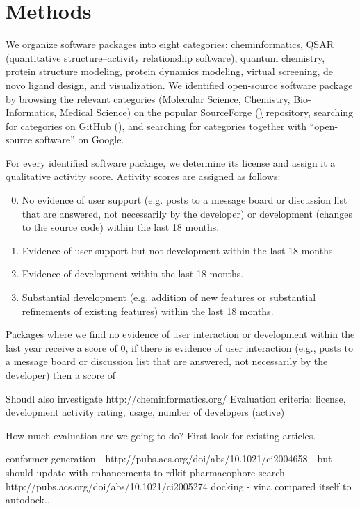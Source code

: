 \section{Methods}

We organize software packages into eight categories: cheminformatics, QSAR (quantitative structure–activity relationship software), quantum chemistry, protein structure modeling, protein dynamics modeling, virtual screening, de novo ligand design, and visualization.
We identified open-source software package by browsing the relevant categories (Molecular Science, Chemistry, Bio-Informatics, Medical Science) on the popular SourceForge (\href{http://sourceforge.net}) repository, searching for categories on GitHub (\href{http://github.com}), and searching for categories together with ``open-source software'' on Google.

For every identified software package, we determine its license and assign it a qualitative activity score. Activity scores are assigned as follows: 
\begin{enumerate}
  \setcounter{enumi}{-1}
  \item No evidence of user support (e.g. posts to a message board or discussion list that are answered, not necessarily by the developer) or development (changes to the source code) within the last 18 months.
  \item Evidence of user support but not development within the last 18 months.
  \item Evidence of development within the last 18 months.
  \item Substantial development (e.g. addition of new features or substantial refinements of existing features) within the last 18 months.
\end{enumerate}

Packages where we find no evidence of user interaction or development within the last year receive a score of 0, if there is evidence of user interaction (e.g., posts to a message board or discussion list that are answered, not necessarily by the developer) then a score of 

Shoudl also investigate http://cheminformatics.org/
Evaluation criteria: license, development activity rating, usage, number of developers (active)


 
 
 How much evaluation are we going to do?  First look for existing articles.
 
 conformer generation - http://pubs.acs.org/doi/abs/10.1021/ci2004658 - but should update with enhancements to rdkit
 pharmacophore search - http://pubs.acs.org/doi/abs/10.1021/ci2005274
 docking - vina compared itself to autodock..
  
  